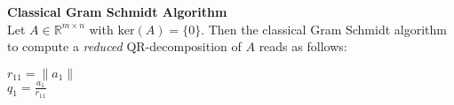 \textbf{Classical Gram Schmidt Algorithm}\\

%				
Let $A \in \mathbb{R}^{m \times n}$ with $\text{ker}(A)=\{0\}$. Then the classical Gram Schmidt algorithm to compute a \textit{reduced} QR-decomposition of $A$ reads as follows:\\
\hspace*{1cm}\begin{minipage}{0.8\textwidth}
	\begin{algorithm}[H]
		$r_{11} = \| a_1 \|$\\
		$q_1 = \frac{a_1}{r_{11}}$\\
	\end{algorithm}
\end{minipage}

